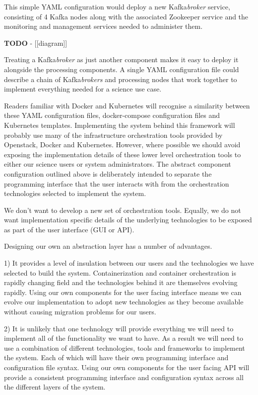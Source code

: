 \documentclass{article}
\newcommand{\yaml} {YAML\xspace}
\newcommand{\docker} {Docker\xspace}
\newcommand{\dockercompose} {docker-compose\xspace}
\newcommand{\kubernetes} {Kubernetes\xspace}
\newcommand{\openstack} {Openstack\xspace}
\newcommand{\kafka} {Kafka\xspace}
\newcommand{\zookeeper} {Zookeeper\xspace}
\newcommand{\kfbroker} {\textit{broker}\xspace}
\newcommand{\kfbrokers} {\textit{brokers}\xspace}
\begin{document}
This simple \yaml configuration would deploy a new \kafka \kfbroker service, consisting of 4 \kafka nodes along with the associated \zookeeper service and the monitoring and management services needed to administer them.

\textbf{TODO} - [[diagram]]

Treating a \kafka \kfbroker as just another component makes it easy to deploy it alongside the processing components. A single \yaml configuration file could describe a chain of \kafka \kfbrokers and processing nodes that work together to implement everything needed for a science use case.

Readers familiar with \docker and \kubernetes will recognise a similarity between these \yaml configuration files, \dockercompose configuration files and \kubernetes templates.
Implementing the system behind this framework will probably use many of the infrastructure orchestration tools provided by \openstack, \docker and \kubernetes.
However, where possible we should avoid exposing the implementation details of
these lower level orchestration tools to either our science users or system administrators. The abstract component configuration outlined above is deliberately intended to separate the programming interface that the user interacts with from the orchestration technologies selected to implement the system.

We don't want to develop a new set of orchestration tools. Equally, we do not want implementation specific details of the underlying technologies to be exposed as part of the user interface (GUI or API).

Designing our own an abstraction layer has a number of advantages.

1) It provides a level of insulation between our users and the technologies we have selected to build the system. Containerization and container orchestration is rapidly changing field and the technologies behind it are themselves evolving rapidly.
Using our own components for the user facing interface means we can evolve our implementation to adopt new technologies as they become available without causing migration problems for our users.

2) It is unlikely that one technology will provide everything we will need to implement all of the functionality we want to have. As a result we will need to use a combination of different technologies, tools and frameworks to implement the system. Each of which will have their own programming interface and configuration file syntax.
Using our own components for the user facing API will provide a consistent programming interface and configuration syntax across all the different layers of the system.
\end{document}
